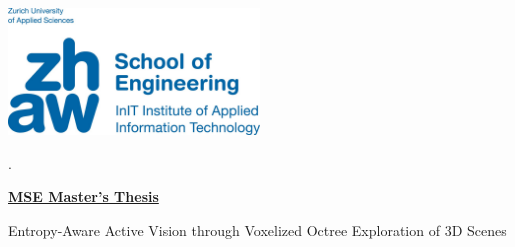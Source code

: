 
\newcommand{\uproman}[1]{\uppercase\expandafter{\romannumeral#1}}

\begin{titlepage}

\includegraphics[width=0.5\textwidth]{images/zhaw_logo.png}


\vskip 1.0cm
\begin{minipage}[b]{0.14\textwidth}
	\hskip 0.05cm
\end{minipage}
\begin{minipage}[b]{0.84\textwidth}
\begin{tiny}.\end{tiny}\vskip 2.8cm
	{\huge
	

	\textbf{\underline{MSE Master's Thesis}}\\
	
	\begin{minipage}[b]{0.9\textwidth}
		Entropy-Aware Active Vision through Voxelized Octree Exploration of 3D Scenes \\
	\end{minipage}

	\begin{minipage}[b]{0.1\textwidth}
	\end{minipage}
	\vskip 0.5cm}


\end{minipage}
\end{titlepage}
